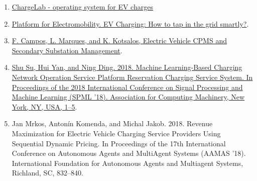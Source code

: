 \documentclass[11pt]{article}
\begin{document}
\begin{enumerate}
    \item \href{https://www.chargelab.co/}{ChargeLab - operating system for EV charges}
    \item \href{https://www.platformelectromobility.eu/2022/05/17/ev-charging-how-to-tap-in-the-grid-smartly/}{Platform for Electromobility. EV Charging: How to tap in the grid smartly?}.
    \item \href{https://mobilityintegrationsymposium.org/wp-content/uploads/sites/10/2018/11/4A_3_Emob18_024_paper_Filipe_Campos.pdf}{F. Campos, L. Marques, and K. Kotsalos, Electric Vehicle CPMS and Secondary Substation Management}.
    \item \href{https://doi.org/10.1145/3297067.3297078}{Shu Su, Hui Yan, and Ning Ding. 2018. Machine Learning-Based Charging Network Operation Service Platform Reservation Charging Service System. In Proceedings of the 2018 International Conference on Signal Processing and Machine Learning (SPML '18). Association for Computing Machinery, New York, NY, USA, 1–5}.
    \item Jan Mrkos, Antonín Komenda, and Michal Jakob. 2018. Revenue Maximization for Electric Vehicle Charging Service Providers Using Sequential Dynamic Pricing. In Proceedings of the 17th International Conference on Autonomous Agents and MultiAgent Systems (AAMAS '18). International Foundation for Autonomous Agents and Multiagent Systems, Richland, SC, 832–840.
\end{enumerate}
\end{document}
